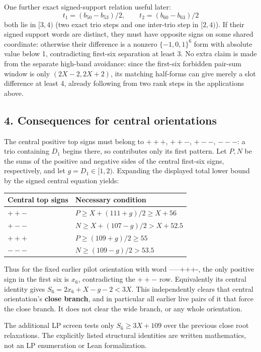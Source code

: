 \documentclass[
  11pt,
]{article}
\begin{document}
One further exact signed-support relation useful later: \[
t_1=(b_{50}-b_{53})/2,\qquad t_2=(b_{60}-b_{63})/2
\] both lie in \([3,4)\) (two exact trio steps and one inter-trio step
in \([2,4)\)). If their signed support words are distinct, they must
have opposite signs on some shared coordinate: otherwise their
difference is a nonzero \(\{-1,0,1\}^6\) form with absolute value below
1, contradicting first-six separation at least 3. No extra claim is made
from the separate high-band avoidance: since the first-six forbidden
pair-sum window is only \((2X-2,2X+2)\), its matching half-forms can
give merely a slot difference at least 4, already following from two
rank steps in the applications above.

\subsection{4. Consequences for central
orientations}\label{consequences-for-central-orientations}

The central positive top signs must belong to \(+++\), \(++-\), \(+--\),
\(---\): a trio containing \(D_1\) begins there, so contributes only its
first pattern. Let \(P,N\) be the sums of the positive and negative
sides of the central first-six signs, respectively, and let
\(g=D_1\in[1,2)\). Expanding the displayed total lower bound by the
signed central equation yields:

\begin{longtable}[]{@{}ll@{}}
\toprule\noalign{}
Central top signs & Necessary condition \\
\midrule\noalign{}
\endhead
\bottomrule\noalign{}
\endlastfoot
\(++-\) & \(P\ge X+(111+g)/2\ge X+56\) \\
\(+--\) & \(N\ge X+(107-g)/2>X+52.5\) \\
\(+++\) & \(P\ge(109+g)/2\ge55\) \\
\(---\) & \(N\ge(109-g)/2>53.5\) \\
\end{longtable}

Thus for the fixed earlier pilot orientation with word
\(\texttt{-----+++-}\), the only positive sign in the first six is
\(x_6\), contradicting the \(++-\) row. Equivalently its central
identity gives \(S_6=2x_6+X-g-2<3X\). This independently clears that
central orientation's \textbf{close branch}, and in particular all
earlier live pairs of it that force the close branch. It does not clear
the wide branch, or any whole orientation.

The additional LP screen tests only \(S_6\ge3X+109\) over the previous
close root relaxations. The explicitly listed structural identities are
written mathematics, not an LP enumeration or Lean formalization.
\end{document}
